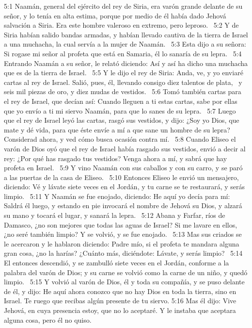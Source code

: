 5:1 Naamán, general del ejército del rey de Siria, era varón grande delante de su señor, y lo tenía en alta estima, porque por medio de él había dado Jehová salvación a Siria. Era este hombre valeroso en extremo, pero leproso.  
5:2 Y de Siria habían salido bandas armadas, y habían llevado cautiva de la tierra de Israel a una muchacha, la cual servía a la mujer de Naamán.  
5:3 Esta dijo a su señora: Si rogase mi señor al profeta que está en Samaria, él lo sanaría de su lepra.  
5:4 Entrando Naamán a su señor, le relató diciendo: Así y así ha dicho una muchacha que es de la tierra de Israel.  
5:5 Y le dijo el rey de Siria: Anda, ve, y yo enviaré cartas al rey de Israel. Salió, pues, él, llevando consigo diez talentos de plata,  y seis mil piezas de oro, y diez mudas de vestidos.  
5:6 Tomó también cartas para el rey de Israel, que decían así: Cuando lleguen a ti estas cartas, sabe por ellas que yo envío a ti mi siervo Naamán, para que lo sanes de su lepra.  
5:7 Luego que el rey de Israel leyó las cartas, rasgó sus vestidos, y dijo: ¿Soy yo Dios, que mate y dé vida, para que éste envíe a mí a que sane un hombre de su lepra? Considerad ahora, y ved cómo busca ocasión contra mí.  
5:8 Cuando Eliseo el varón de Dios oyó que el rey de Israel había rasgado sus vestidos, envió a decir al rey: ¿Por qué has rasgado tus vestidos? Venga ahora a mí, y sabrá que hay profeta en Israel.  
5:9 Y vino Naamán con sus caballos y con su carro, y se paró a las puertas de la casa de Eliseo.  
5:10 Entonces Eliseo le envió un mensajero, diciendo: Vé y lávate siete veces en el Jordán, y tu carne se te restaurará, y serás limpio.  
5:11 Y Naamán se fue enojado, diciendo: He aquí yo decía para mí: Saldrá él luego, y estando en pie invocará el nombre de Jehová su Dios, y alzará su mano y tocará el lugar, y sanará la lepra.  
5:12 Abana y Farfar, ríos de Damasco, ¿no son mejores que todas las aguas de Israel? Si me lavare en ellos, ¿no seré también limpio? Y se volvió, y se fue enojado.  
5:13 Mas sus criados se le acercaron y le hablaron diciendo: Padre mío, si el profeta te mandara alguna gran cosa, ¿no la harías? ¿Cuánto más, diciéndote: Lávate, y serás limpio?  
5:14 El entonces descendió, y se zambulló siete veces en el Jordán, conforme a la palabra del varón de Dios; y su carne se volvió como la carne de un niño, y quedó limpio.  
5:15 Y volvió al varón de Dios, él y toda su compañía, y se puso delante de él, y dijo: He aquí ahora conozco que no hay Dios en toda la tierra, sino en Israel. Te ruego que recibas algún presente de tu siervo. 
5:16 Mas él dijo: Vive Jehová, en cuya presencia estoy, que no lo aceptaré. Y le instaba que aceptara alguna cosa, pero él no quiso.  
